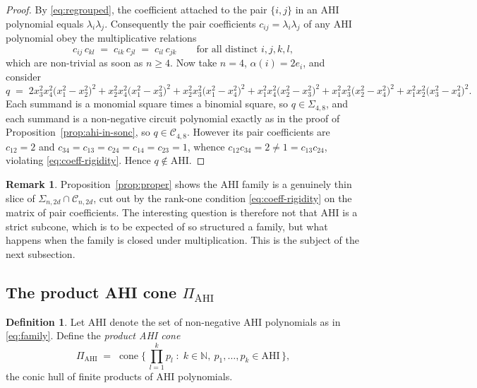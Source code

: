 \documentclass[12pt]{elsarticle}
\theoremstyle{definition}
\newtheorem{definition}[theorem]{Definition}
\newtheorem{remark}[theorem]{Remark}
\newcommand{\AHI}{\mathrm{AHI}}
\newcommand{\PiAHI}{\Pi_{\AHI}}
\newcommand{\SONC}{\mathcal{C}}
\begin{document}
\begin{proof}
By \eqref{eq:regrouped}, the coefficient attached to the pair $\{i,j\}$ in an AHI polynomial equals $\lambda_i\lambda_j$. Consequently the pair coefficients $c_{ij}=\lambda_i\lambda_j$ of any AHI polynomial obey the multiplicative relations
\begin{equation}\label{eq:coeff-rigidity}
c_{ij}\,c_{kl} \;=\; c_{ik}\,c_{jl} \;=\; c_{il}\,c_{jk}
\qquad\text{for all distinct } i,j,k,l,
\end{equation}
which are non-trivial as soon as $n\ge 4$. Now take $n=4$, $\alpha(i)=2e_i$, and consider
\[
q \;=\; 2x_3^2x_4^2\big(x_1^2-x_2^2\big)^2 + x_2^2x_4^2\big(x_1^2-x_3^2\big)^2 + x_2^2x_3^2\big(x_1^2-x_4^2\big)^2
+ x_1^2x_4^2\big(x_2^2-x_3^2\big)^2 + x_1^2x_3^2\big(x_2^2-x_4^2\big)^2 + x_1^2x_2^2\big(x_3^2-x_4^2\big)^2 .
\]
Each summand is a monomial square times a binomial square, so $q\in\Sigma_{4,8}$, and each summand is a non-negative circuit polynomial exactly as in the proof of Proposition~\ref{prop:ahi-in-sonc}, so $q\in\SONC_{4,8}$. However its pair coefficients are $c_{12}=2$ and $c_{34}=c_{13}=c_{24}=c_{14}=c_{23}=1$, whence $c_{12}c_{34}=2\neq 1=c_{13}c_{24}$, violating \eqref{eq:coeff-rigidity}. Hence $q\notin\AHI$.
\end{proof}

\begin{remark}\label{rem:proper-meaning}
Proposition~\ref{prop:proper} shows the AHI family is a genuinely thin slice of $\Sigma_{n,2d}\cap\SONC_{n,2d}$, cut out by the rank-one condition \eqref{eq:coeff-rigidity} on the matrix of pair coefficients. The interesting question is therefore not that $\AHI$ is a strict subcone, which is to be expected of so structured a family, but what happens when the family is closed under multiplication. This is the subject of the next subsection.
\end{remark}

\subsection{The product AHI cone \texorpdfstring{$\PiAHI$}{Pi AHI}}\label{subsec:piahi}

\begin{definition}\label{def:piahi}
Let $\AHI$ denote the set of non-negative AHI polynomials as in \eqref{eq:family}. Define the \emph{product AHI cone}
\[
\PiAHI \;=\; \operatorname{cone}\Big\{\, \textstyle\prod_{l=1}^{k} p_l \;:\;
k\in\mathbb{N},\ p_1,\dots,p_k \in \AHI \,\Big\},
\]
the conic hull of finite products of AHI polynomials.
\end{definition}
\end{document}
